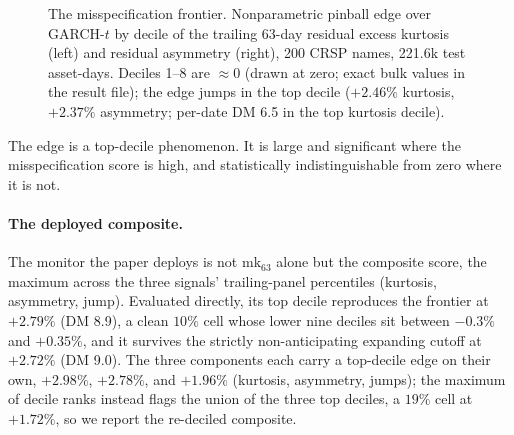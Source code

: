 \documentclass[11pt]{article}
\theoremstyle{remark}
\begin{document}
\begin{figure}[t]
\centering
{}\hfill
{}
\caption{The misspecification frontier. Nonparametric pinball edge over
GARCH-$t$ by decile of the trailing 63-day residual excess kurtosis
(left) and residual asymmetry (right), 200 CRSP names, 221.6k test
asset-days. Deciles 1--8 are $\approx 0$ (drawn at zero; exact bulk
values in the result file); the edge jumps in the top decile
($+2.46\%$ kurtosis, $+2.37\%$ asymmetry; per-date DM 6.5 in the top
kurtosis decile).}
\label{fig:frontier}
\end{figure}

The edge is a top-decile phenomenon. It is large and significant
where the misspecification score is high, and
statistically indistinguishable from zero where it is not.

\paragraph{The deployed composite.} The monitor the paper deploys is not
$\mathrm{mk}_{63}$ alone but the composite score, the maximum across the
three signals' trailing-panel percentiles (kurtosis, asymmetry, jump).
Evaluated directly, its top decile reproduces the frontier at $+2.79\%$
(DM 8.9), a clean $10\%$ cell whose lower nine deciles sit between
$-0.3\%$ and $+0.35\%$, and it survives the strictly non-anticipating expanding
cutoff at $+2.72\%$ (DM 9.0). The three components each carry a
top-decile edge on their own, $+2.98\%$, $+2.78\%$, and $+1.96\%$
(kurtosis, asymmetry, jumps); the maximum of decile ranks
instead flags the union of the three top deciles, a $19\%$ cell at
$+1.72\%$, so we report the re-deciled composite.
\end{document}
